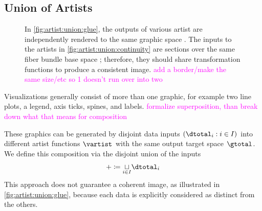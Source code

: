 \documentclass[10pt,journal,compsoc]{IEEEtran}
\newcommand{\note}[1]{\textcolor{magenta}{#1}}
\theoremstyle{definition}
\theoremstyle{remark}
\begin{document}
\subsection{Union of Artists}
\label{sec:artist:union}
\begin{figure}[!h]
\centering
{}
{}
\caption{In \autoref{fig:artist:union:glue}, the outputs of various artist are independently rendered to the same graphic space \gtotal. The inputs to the artists in \autoref{fig:artist:union:continuity} are sections over the same fiber bundle base space \dbase; therefore, they should share transformation functions to produce a consistent image. \note{add a border/make the same size/etc so 1 doesn't run over into two}}
\end{figure}

Visualizations generally consist of more than one graphic, for example two line plots, a legend, axis ticks, spines, and labels. \note{formalize superposition, than break down what that means for composition}

These graphics can be generated by disjoint data inputs  $(\dtotal_i: i\in I)$ into different artist functions $\vartist$ with the same output target space $\gtotal$. We define this composition via the disjoint union of the inputs 
\begin{equation}
  \label{eq:artist:union:glue}
+ \coloneqq \underset{i\in I}{\sqcup} \dtotal_{i}
\end{equation}
This approach does not guarantee a coherent image, as illustrated in \autoref{fig:artist:union:glue}, because each data is explicitly considered as distinct from the others. 
\end{document}
